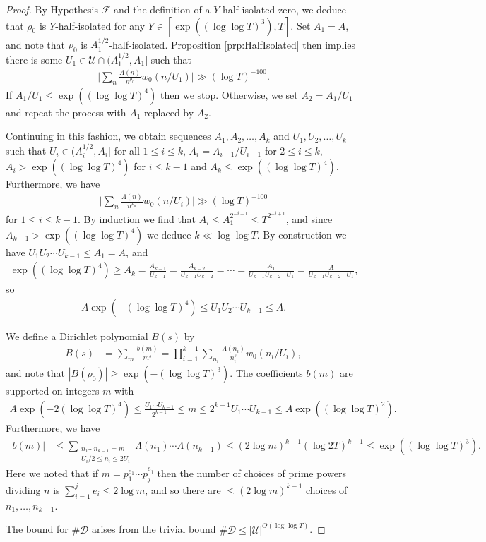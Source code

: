 \documentclass[12pt]{amsart}
\theoremstyle{plain}
\theoremstyle{definition}
\theoremstyle{remark}
\begin{document}
\begin{proof}
By Hypothesis $\mathcal{F}$ and the definition of a $Y$-half-isolated zero, we deduce that $\rho_0$ is $Y$-half-isolated for any $Y \in [\exp((\log \log T)^3),T]$. Set $A_1 = A$, and note that $\rho_0$ is $A_1^{1/2}$-half-isolated. Proposition \ref{prp:HalfIsolated} then implies there is some $U_1 \in \mathcal{U} \cap (A_1^{1/2},A_1]$ such that
\begin{align*}
\Big|\sum_n \frac{\Lambda(n)}{n^{\rho_0}}w_0(n/U_1) \Big| \gg (\log T)^{-100}.
\end{align*}
If $A_1/U_1\leq \exp((\log \log T)^4)$ then we stop. Otherwise, we set $A_2 = A_1/U_1$ and repeat the process with $A_1$ replaced by $A_2$.

Continuing in this fashion, we obtain sequences $A_1,A_2,\ldots,A_k$ and $U_1,U_2,\ldots,U_k$ such that $U_i \in (A_i^{1/2},A_i]$ for all $1\leq i \leq k$, $A_i = A_{i-1}/U_{i-1}$ for $2\leq i \leq k$, $A_i > \exp((\log \log T)^4)$ for $i \leq k-1$ and $A_k \leq \exp((\log \log T)^4)$. Furthermore, we have
\begin{align*}
\Big|\sum_n \frac{\Lambda(n)}{n^{\rho_0}}w_0(n/U_i) \Big| \gg (\log T)^{-100}
\end{align*}
for $1\leq i \leq k-1$. By induction we find that $A_i \leq A_1^{2^{-i+1}} \leq T^{2^{-i+1}}$, and since $A_{k-1} > \exp((\log \log T)^4)$ we deduce $k\ll \log \log T$. By construction we have $U_1 U_2 \cdots U_{k-1}\leq A_1 = A$, and
\begin{align*}
\exp((\log \log T)^4) \geq A_k = \frac{A_{k-1}}{U_{k-1}} = \frac{A_{k-2}}{U_{k-1}U_{k-2}} = \cdots = \frac{A_1}{U_{k-1}U_{k-2}\cdots U_1} = \frac{A}{U_{k-1}U_{k-2}\cdots U_1},
\end{align*}
so
\begin{align*}
A \exp(-(\log \log T)^4) \leq U_1 U_2 \cdots U_{k-1} \leq A.
\end{align*}

We define a Dirichlet polynomial $B(s)$ by
\begin{align*}
B(s) &= \sum_m \frac{b(m)}{m^s} = \prod_{i=1}^{k-1}\sum_{n_i} \frac{\Lambda(n_i)}{n_i^s}w_0(n_i/U_i),
\end{align*}
and note that $|B(\rho_0)| \geq \exp(-(\log \log T)^3)$. The coefficients $b(m)$ are supported on integers $m$ with
\begin{align*}
A\exp(-2(\log \log T)^4)\leq \frac{U_1 \cdots U_{k-1}}{2^{k-1}}\leq m\leq 2^{k-1}U_1\cdots U_{k-1} \leq A \exp((\log \log T)^2).
\end{align*}
Furthermore, we have
\begin{align*}
|b(m)| &\leq \sum_{\substack{n_1\cdots n_{k-1} = m \\ U_i/2 \leq n_i \leq 2U_i}} \Lambda(n_1)\cdots \Lambda(n_{k-1})\leq (2\log m)^{k-1}(\log 2T)^{k-1}\leq \exp((\log \log T)^3).
\end{align*}
Here we noted that if $m=p_1^{e_1}\cdots p_j^{e_j}$ then the number of choices of prime powers dividing $n$ is $\sum_{i=1}^je_i\leq 2\log m$, and so there are $\leq (2\log m)^{k-1}$ choices of $n_1,\dots,n_{k-1}$.

The bound for $\#\mathcal{D}$ arises from the trivial bound $\#\mathcal{D} \leq |\mathcal{U}|^{O(\log \log T)}$.
\end{proof}
\end{document}
